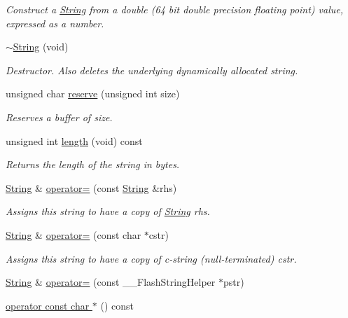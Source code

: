 \begin{DoxyCompactItemize}
\begin{DoxyCompactList}\small\item\em Construct a \hyperlink{class_string}{String} from a double (64 bit double precision floating point) value, expressed as a number. \end{DoxyCompactList}\item 
\hyperlink{class_string_ab4027f1abc8f8c0134f6098126de71e5}{$\sim$\+String} (void)
\begin{DoxyCompactList}\small\item\em Destructor. Also deletes the underlying dynamically allocated string. \end{DoxyCompactList}\item 
unsigned char \hyperlink{class_string_a138edcc762cb87649d81757d1e4ab419}{reserve} (unsigned int size)
\begin{DoxyCompactList}\small\item\em Reserves a buffer of size. \end{DoxyCompactList}\item 
unsigned int \hyperlink{class_string_a21691d4bac5ec852977018fef6fb9c8a}{length} (void) const
\begin{DoxyCompactList}\small\item\em Returns the length of the string in bytes. \end{DoxyCompactList}\item 
\hyperlink{class_string}{String} \& \hyperlink{class_string_aeb3b38d9acd37e511d82c9f4dc7565a3}{operator=} (const \hyperlink{class_string}{String} \&rhs)
\begin{DoxyCompactList}\small\item\em Assigns this string to have a copy of \hyperlink{class_string}{String} rhs. \end{DoxyCompactList}\item 
\hyperlink{class_string}{String} \& \hyperlink{class_string_ab7151855d8e95ab3703f0284298d9ac1}{operator=} (const char $\ast$cstr)
\begin{DoxyCompactList}\small\item\em Assigns this string to have a copy of c-\/string (null-\/terminated) cstr. \end{DoxyCompactList}\item 
\hyperlink{class_string}{String} \& \hyperlink{class_string_a965951ee729f850adb40d3c0997922bb}{operator=} (const \+\_\+\+\_\+\+Flash\+String\+Helper $\ast$pstr)
\item 
\hyperlink{class_string_a9a12caedc885ac44c86d104a8cb60f82}{operator const char $\ast$} () const

\end{DoxyCompactItemize}
